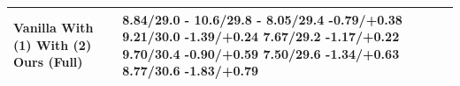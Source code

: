 \begin{tabular}{ll}
\toprule
Vanilla With (1) With (2) Ours (Full) & 8.84/29.0 - 10.6/29.8 - 8.05/29.4 -0.79/+0.38 9.21/30.0 -1.39/+0.24 7.67/29.2 -1.17/+0.22 9.70/30.4 -0.90/+0.59 7.50/29.6 -1.34/+0.63 8.77/30.6 -1.83/+0.79 \\
\midrule
\bottomrule
\end{tabular}
